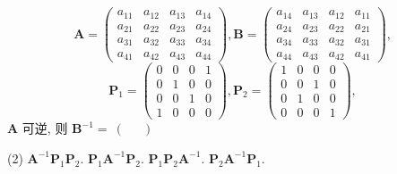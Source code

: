\[ \bm{A} = \begin{pmatrix} a_{11} & a_{12} & a_{13} & a_{14} \\ a_{21} & a_{22} & a_{23} & a_{24} \\ a_{31} & a_{32} & a_{33} & a_{34} \\ a_{41} & a_{42} & a_{43} & a_{44} \end{pmatrix}, \bm{B} = \begin{pmatrix} a_{14} & a_{13} & a_{12} & a_{11} \\ a_{24} & a_{23} & a_{22} & a_{21} \\ a_{34} & a_{33} & a_{32} & a_{31} \\ a_{44} & a_{43} & a_{42} & a_{41} \end{pmatrix}, \]
\[ \bm{P}_1 = \begin{pmatrix} 0 & 0 & 0 & 1 \\ 0 & 1 & 0 & 0 \\ 0 & 0 & 1 & 0 \\ 1 & 0 & 0 & 0 \end{pmatrix}, \bm{P}_2 = \begin{pmatrix} 1 & 0 & 0 & 0 \\ 0 & 0 & 1 & 0 \\ 0 & 1 & 0 & 0 \\ 0 & 0 & 0 & 1 \end{pmatrix}, \]
$\displaystyle \bm{A}$ 可逆, 则 $\displaystyle \bm{B}^{-1} =~(~\quad~)$
\begin{tasks}(2)
  \task $\displaystyle \bm{A}^{-1}\bm{P}_1\bm{P}_2.$
  \task $\displaystyle \bm{P}_1\bm{A}^{-1}\bm{P}_2.$
  \task $\displaystyle \bm{P}_1\bm{P}_2\bm{A}^{-1}.$
  \task $\displaystyle \bm{P}_2\bm{A}^{-1}\bm{P}_1.$
\end{tasks}


